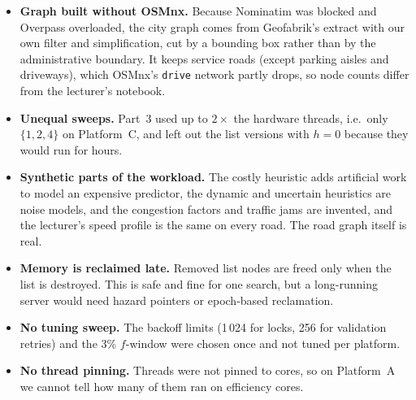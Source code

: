 \begin{itemize}
        parallel query creates and joins its $T$ threads and reports medians of 3
        repetitions without spread. The extended Platform~D suite (\texttt{run\_ext.sh})
        isolates search scaling via a persistent \texttt{ThreadPool}, pins threads to
        physical cores first, and reports 7-repetition standard deviation, IQR, and
        per-query $p_{95}$/$p_{99}$ latencies.
  \item \textbf{Graph built without OSMnx.} Because Nominatim was blocked
        and Overpass overloaded, the city graph comes from Geofabrik's extract
        with our own filter and simplification, cut by a bounding box rather
        than by the administrative boundary. It keeps service roads (except
        parking aisles and driveways), which OSMnx's \texttt{drive} network
        partly drops, so node counts differ from the lecturer's notebook.
  \item \textbf{Unequal sweeps.} Part~3 used up to $2\times$ the hardware
        threads, i.e.\ only $\{1,2,4\}$ on Platform~C, and left out the list
        versions with $h = 0$ because they would run for hours.
  \item \textbf{Synthetic parts of the workload.} The costly heuristic adds
        artificial work to model an expensive predictor, the dynamic and
        uncertain heuristics are noise models, and the congestion factors and
        traffic jams are invented, and the lecturer's speed profile is the same on
        every road. The road graph itself is real.
  \item \textbf{Memory is reclaimed late.} Removed list nodes are freed only
        when the list is destroyed. This is safe and fine for one search, but
        a long-running server would need hazard pointers or epoch-based
        reclamation.
  \item \textbf{No tuning sweep.} The backoff limits (1\,024 for locks, 256
        for validation retries) and the 3\% $f$-window were chosen once and not
        tuned per platform.
  \item \textbf{No thread pinning.} Threads were not pinned to cores, so on
        Platform~A we cannot tell how many of them ran on efficiency cores.
\end{itemize}
